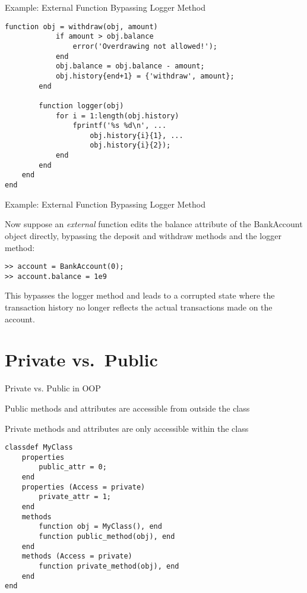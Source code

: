 \documentclass[handout]{beamer}
\begin{document}
\begin{frame}[fragile]{Example: External Function Bypassing Logger Method}
    
    \begin{lstlisting}[style=Matlab]
        function obj = withdraw(obj, amount)
            if amount > obj.balance
                error('Overdrawing not allowed!');
            end
            obj.balance = obj.balance - amount;
            obj.history{end+1} = {'withdraw', amount};
        end
        
        function logger(obj)
            for i = 1:length(obj.history)
                fprintf('%s %d\n', ...
                    obj.history{i}{1}, ... 
                    obj.history{i}{2});
            end
        end
    end
end
    \end{lstlisting}
    
\end{frame}


\begin{frame}[fragile]{Example: External Function Bypassing Logger Method}
    
    Now suppose an \textit{external} function edits the balance attribute of the BankAccount object directly, bypassing the deposit and withdraw methods and the logger method:
    
    \begin{lstlisting}[style=Matlab]
>> account = BankAccount(0);
>> account.balance = 1e9
    \end{lstlisting}
    
    This bypasses the logger method and leads to a corrupted state where the transaction history no longer reflects the actual transactions made on the account.
    
\end{frame}


\section{Private vs.\ Public}

\begin{frame}[fragile]{Private vs. Public in OOP}

    Public methods and attributes are accessible from outside the class
    
    Private methods and attributes are only accessible within the class
    
    \begin{lstlisting}[style=Matlab]
classdef MyClass
    properties
        public_attr = 0;
    end
    properties (Access = private)
        private_attr = 1;
    end
    methods
        function obj = MyClass(), end
        function public_method(obj), end
    end
    methods (Access = private)
        function private_method(obj), end
    end
end
    \end{lstlisting}
    
\end{frame}
\end{document}
